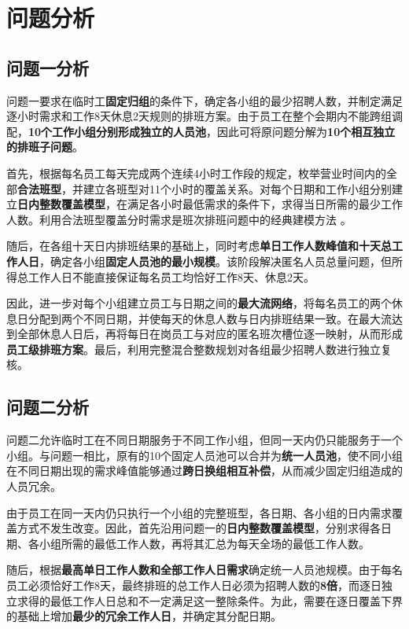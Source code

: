 \documentclass[withoutpreface,bwprint]{cumcmthesis}
\begin{document}
\section{问题分析}

\subsection{问题一分析}

问题一要求在临时工\textbf{固定归组}的条件下，确定各小组的最少招聘人数，并制定满足逐小时需求和工作8天休息2天规则的排班方案。由于员工在整个会期内不能跨组调配，\textbf{10个工作小组分别形成独立的人员池}，因此可将原问题分解为\textbf{10个相互独立的排班子问题}。

首先，根据每名员工每天完成两个连续4小时工作段的规定，枚举营业时间内的全部\textbf{合法班型}，并建立各班型对11个小时的覆盖关系。对每个日期和工作小组分别建立\textbf{日内整数覆盖模型}，在满足各小时最低需求的条件下，求得当日所需的最少工作人数。利用合法班型覆盖分时需求是班次排班问题中的经典建模方法
\cite{dantzig1954comment,alfares2004tour}。

随后，在各组十天日内排班结果的基础上，同时考虑\textbf{单日工作人数峰值和十天总工作人日}，确定各小组\textbf{固定人员池的最小规模}。该阶段解决匿名人员总量问题，但所得总工作人日不能直接保证每名员工均恰好工作8天、休息2天。

因此，进一步对每个小组建立员工与日期之间的\textbf{最大流网络}，将每名员工的两个休息日分配到两个不同日期，并使每天的休息人数与日内排班结果一致\cite{ford1956maximal}。在最大流达到全部休息人日后，再将每日在岗员工与对应的匿名班次槽位逐一映射，从而形成\textbf{员工级排班方案}。最后，利用完整混合整数规划对各组最少招聘人数进行独立复核。

\subsection{问题二分析}

问题二允许临时工在不同日期服务于不同工作小组，但同一天内仍只能服务于一个小组。与问题一相比，原有的10个固定人员池可以合并为\textbf{统一人员池}，使不同小组在不同日期出现的需求峰值能够通过\textbf{跨日换组相互补偿}，从而减少固定归组造成的人员冗余。

由于员工在同一天内仍只执行一个小组的完整班型，各日期、各小组的日内需求覆盖方式不发生改变。因此，首先沿用问题一的\textbf{日内整数覆盖模型}，分别求得各日期、各小组所需的最低工作人数，再将其汇总为每天全场的最低工作人数。

随后，根据\textbf{最高单日工作人数和全部工作人日需求}确定统一人员池规模。由于每名员工必须恰好工作8天，最终排班的总工作人日必须为招聘人数的\textbf{8倍}，而逐日独立求得的最低工作人日总和不一定满足这一整除条件。为此，需要在逐日覆盖下界的基础上增加\textbf{最少的冗余工作人日}，并确定其分配日期。
\end{document}
